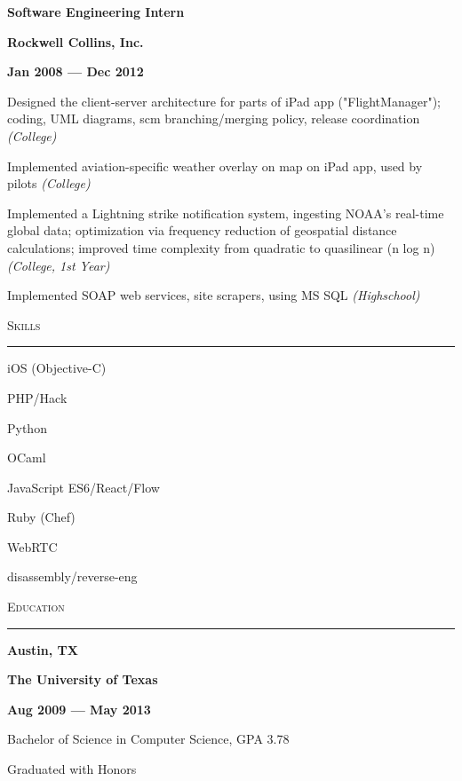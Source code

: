 \documentclass[letterpaper,12pt,oneside]{article}
\newcommand{\Heading}[1]{
  \vspace{2ex}
  {\large\textsc{#1}} \\
  \vspace{-2ex}
  \hrule
}
\newcommand{\OneThirdBox}[1]{%
  \parbox{.333\textwidth}{#1}%
}
\newcommand{\LeftCenterRight}[4][\normalfont]{%
  \OneThirdBox{
    \begin{flushleft}%
      #1{#2}%
    \end{flushleft}%
  }%
  \OneThirdBox{
    \begin{center}%
      #1{#3}%
    \end{center}%
  }%
  \OneThirdBox{
    \begin{flushright}%
      #1{#4}%
    \end{flushright}%
  }%
}
\newenvironment{Role}[4]
{
  \LeftCenterRight[\textbf]{#1}{#2}{#3 --- #4}
  \begin{compactitem}
  \vspace{-2ex}
}
{
  \end{compactitem}
  \vspace{-1ex}
}
\begin{document}
\begin{Role}
{Software Engineering Intern}
{Rockwell Collins, Inc.}
{Jan 2008}{Dec 2012}
  \item Designed the client-server architecture for parts of iPad app
    ("FlightManager"); coding, UML diagrams, scm branching/merging policy,
    release coordination \emph{(College)}
  \item Implemented aviation-specific weather overlay on map on iPad app, used
    by pilots \emph{(College)}
  \item Implemented a Lightning strike notification system, ingesting NOAA's
    real-time global data; optimization via frequency reduction of geospatial
    distance calculations; improved time complexity from quadratic to
    quasilinear (n log n) \emph{(College, 1st Year)}
  \item Implemented SOAP web services, site scrapers, using MS SQL
    \emph{(Highschool)}
\end{Role}


\Heading{Skills}
\vspace{2ex}
\begin{multicols}{3}
\small
\begin{compactitem}
  \item iOS (Objective-C)
  \item PHP/Hack
  \item Python
  \item OCaml
  \item JavaScript ES6/React/Flow
  \item Ruby (Chef)
  \item WebRTC
  \item disassembly/reverse-eng
\end{compactitem}
\normalsize
\end{multicols}


\Heading{Education}

\begin{Role}
  {Austin, TX}
  {The University of Texas}
  {Aug 2009}
  {May 2013}
  \item Bachelor of Science in Computer Science, GPA 3.78
  \item Graduated with Honors
\end{Role}
\end{document}
